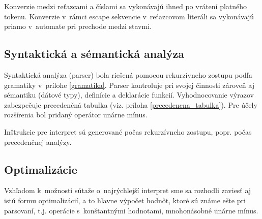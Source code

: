 \documentclass[12pt,a4paper,titlepage,final]{article}
\begin{document}
Konverzie medzi reťazcami a číslami sa vykonávajú ihneď po vrátení platného tokenu.
Konverzie v~rámci escape sekvencie v~reťazcovom literáli sa vykonávajú
 priamo v~automate pri prechode medzi stavmi.

\subsection{Syntaktická a sémantická analýza}
Syntaktická analýza (parser) bola riešená pomocou rekurzívneho zostupu 
 podľa gramatiky v~prílohe \ref{gramatika}.
Parser kontroluje pri svojej činnosti zároveň aj sémantiku (dátové typy),
definície a deklarácie funkcií.
Vyhodnocovanie výrazov zabezpečuje precedenčná tabuľka 
 (viz. príloha \ref{precedencna_tabulka}). Pre účely rozšírenia bol
 pridaný operátor unárne mínus.

Inštrukcie pre interpret sú generované počas rekurzívneho zostupu, popr. počas
precedenčnej analýzy.

     
     
     
     

\subsection{Optimalizácie}
Vzhľadom k~možnosti sútaže o~najrýchlejší interpret sme sa rozhodli zaviesť aj
istú formu optimalizácií, a to hlavne výpočet hodnôt, ktoré sú známe ešte pri
parsovaní, t.j. operácie s~konštantnými hodnotami, mnohonásobné unárne mínus.
\end{document}
